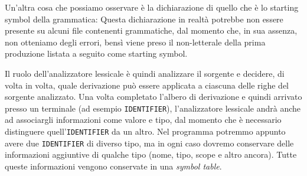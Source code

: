 \documentclass[class=book, crop=false, oneside, 12pt]{standalone}
\begin{document}



Un'altra cosa che possiamo osservare è la dichiarazione di quello che è lo starting symbol della grammatica:
Questa dichiarazione in realtà potrebbe non essere presente su alcuni file contenenti grammatiche, dal momento che, in sua assenza, non otteniamo degli errori, bensì viene preso il non-letterale della prima produzione listata a seguito come starting symbol.


Il ruolo dell’analizzatore lessicale è quindi analizzare il sorgente e decidere, di volta in volta, quale derivazione può essere applicata a ciascuna delle righe del sorgente analizzato. Una volta completato l'albero di derivazione e quindi arrivato presso un terminale (ad esempio \texttt{IDENTIFIER}), l'analizzatore lessicale andrà anche ad associargli informazioni come valore e tipo, dal momento che è necessario distinguere quell'\texttt{IDENTIFIER} da un altro. Nel programma potremmo appunto avere due \texttt{IDENTIFIER} di diverso tipo, ma in ogni caso dovremo conservare delle informazioni aggiuntive di qualche tipo (nome, tipo, scope e altro ancora). Tutte queste informazioni vengono conservate in una \emph{symbol table}.
\end{document}
